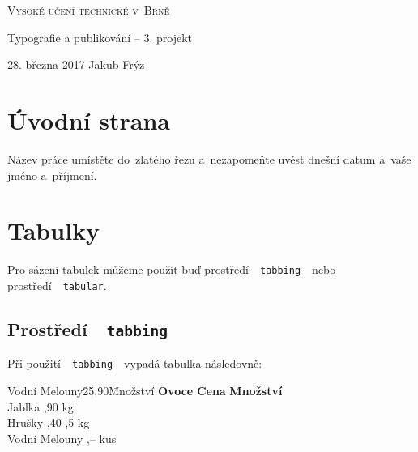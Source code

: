 \documentclass[a4paper, 11pt]{article}
\begin{document}
\begin{titlepage}

\begin{center}

\textsc{{\Huge Vysoké učení technické v~Brně}\\}


{\LARGE Typografie a publikování -- 3. projekt}\\



{\Large 28. března 2017 \hfill Jakub Frýz}

\end{center}

\end{titlepage}

\section{Úvodní strana}

Název práce umístěte do~zlatého řezu a~nezapomeňte uvést dnešní datum a~vaše jméno a~příjmení.

\section{Tabulky}

Pro sázení tabulek můžeme použít buď prostředí\ \ \texttt{tabbing}\ \ nebo prostředí\ \ \texttt{tabular}.

\subsection{Prostředí\ \ \texttt{tabbing}}

Při použití\ \ \texttt{tabbing}\ \ vypadá tabulka následovně:

\begin{tabbing}
Vodní Melouny\quad	\= 25,90\quad	\= Množství	\kill
\textbf{Ovoce}	\> \textbf{Cena	}	\> \textbf{Množství}	\\
Jablka			,90			 kg					\\
Hrušky			,40			,5 kg				\\
Vodní Melouny	,--			 kus				\\
\end{tabbing}
\end{document}
